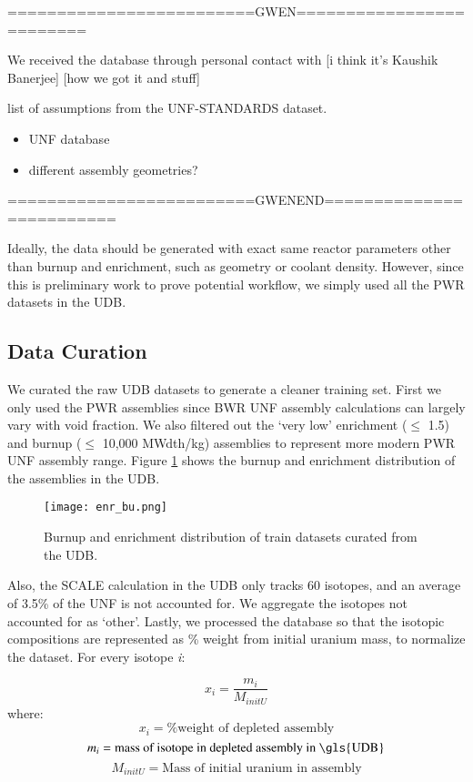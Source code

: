 =========================GWEN=========================

We received the database through personal contact
with [i think it's Kaushik Banerjee] [how we got it and stuff]

list of assumptions from the \gls{UNF-STANDARDS} dataset.
\begin{itemize}
    \item UNF database
    \item different assembly geometries?
\end{itemize}

=========================GWENEND=========================

Ideally, the data should be generated with exact same reactor
parameters other than burnup and enrichment, such as geometry or
coolant density. However, since
this is preliminary work to prove potential workflow, we
simply used all the \gls{PWR} datasets in the \gls{UDB}.

\subsection{Data Curation}

We curated the raw \gls{UDB} datasets to generate
a cleaner training set. First we only used the 
\gls{PWR} assemblies since \gls{BWR} \gls{UNF} assembly
calculations can largely vary with void fraction.
We also filtered out the
`very low' enrichment ($\leq$ 1.5) and
burnup ($\leq$ 10,000 MWdth/kg)
assemblies to represent more modern \gls{PWR} \gls{UNF}
assembly range. Figure \ref{fig:enr_bu} shows the
burnup and enrichment distribution of the assemblies in the
\gls{UDB}.


\begin{figure}
    \centering
    \texttt{[image: enr\_bu.png]}
    \caption{Burnup and enrichment distribution of train
             datasets curated from the \gls{UDB}.}
    \label{fig:enr_bu}
\end{figure}


Also, the SCALE calculation in the \gls{UDB} only tracks 60 isotopes,
and an average of 3.5\% of the \gls{UNF} is not accounted for. We
aggregate the isotopes not accounted for as `other'. Lastly,
we processed the database so that the isotopic compositions are 
represented as \% weight from initial uranium mass, to normalize
the dataset. For every isotope \textit{i}:

\begin{equation}
x_i = \frac{m_i}{M_{initU}}
\end{equation}
where:
\[
x_i = \text{\% weight of depleted assembly}
\]
\[
m_i = \text{mass of isotope in depleted assembly in \gls{UDB}}
\]
\[
M_{initU} = \text{Mass of initial uranium in assembly}
\]


